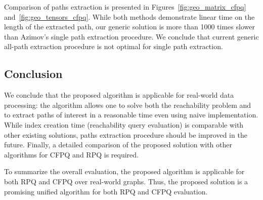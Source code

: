 Comparison of paths extraction is presented in Figures~\ref{fig:geo_matrix_cfpq} and~\ref{fig:geo_tensors_cfpq}.
While both methods demonstrate linear time on the length of the extracted path, our generic solution is more than 1000 times slower than Azimov's single path extraction procedure.
We conclude that current generic all-path extraction procedure is not optimal for single path extraction.

\subsection{Conclusion}

We conclude that the proposed algorithm is applicable for real-world data processing: the algorithm allows one to solve both the reachability problem and to extract paths of interest in a reasonable time even using naive implementation.
While index creation time (reachability query evaluation) is comparable with other existing solutions, paths extraction procedure should be improved in the future.
Finally, a detailed comparison of the proposed solution with other algorithms for CFPQ and RPQ is required.

To summarize the overall evaluation, the proposed algorithm is applicable for both RPQ and CFPQ over real-world graphs.
Thus, the proposed solution is a promising unified algorithm for both RPQ and CFPQ evaluation.
